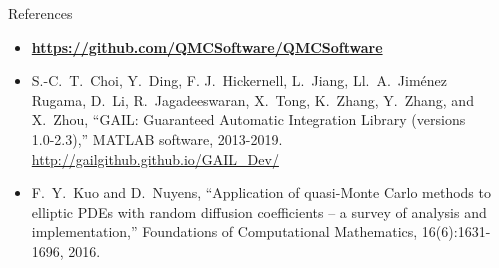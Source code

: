 \documentclass[final]{beamer}
\newlength{\onecolwid}
\newlength{\twocolwid}
\begin{document}
\begin{frame}[t]
\begin{columns}[t]
\begin{column}{\twocolwid}
\begin{columns}[t,totalwidth=\twocolwid]
\begin{column}{\onecolwid}
\end{column}

\begin{column}{\onecolwid}\vspace{-1in}

\begin{block}{References}
\begin{itemize}
    \item \textbf{\url{https://github.com/QMCSoftware/QMCSoftware}}
    
    \item S.-C.~T.~Choi, Y.~Ding, F. J.~Hickernell, L.~Jiang,
    Ll.~A.~Jim\'enez Rugama, D.~Li, R.~Jagadeeswaran, X.~Tong, K.~Zhang, Y.~Zhang, and X.~Zhou, ``GAIL: Guaranteed Automatic Integration Library (versions 1.0-2.3),'' MATLAB software, 2013-2019.
    \url{http://gailgithub.github.io/GAIL\_Dev/}
    
    \item F.~Y.~Kuo and D.~Nuyens, ``Application of quasi-Monte Carlo methods to elliptic PDEs with random diffusion coefficients -- a survey of analysis and implementation,'' Foundations of Computational Mathematics, 16(6):1631-1696, 2016.
\end{itemize}
\end{block}

\end{column}
\end{columns}

\end{column}

\end{columns}



\end{frame}
\end{document}
